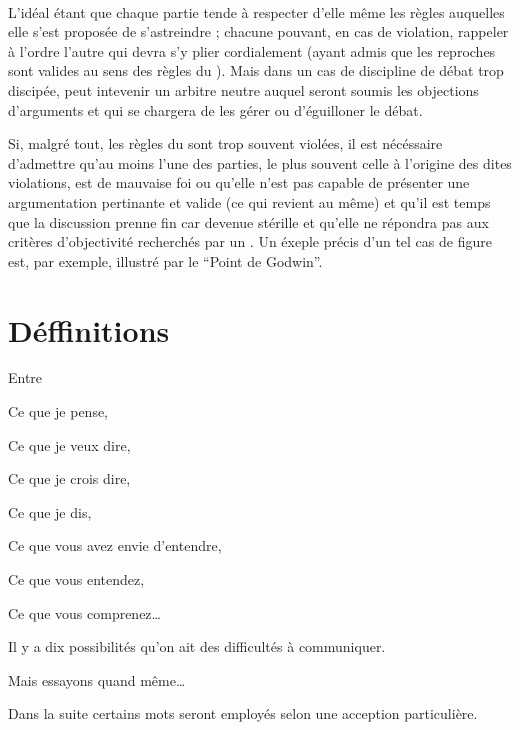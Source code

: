 \paragraph{}
L’idéal étant que chaque partie tende à respecter d’elle même les règles auquelles elle s’est proposée de s’astreindre ; chacune pouvant, en cas de violation, rappeler à l’ordre l’autre qui devra s’y plier cordialement (ayant admis que les reproches sont valides au sens des règles du \mainabbr{}). Mais dans un cas de discipline de débat trop discipée, peut intevenir un arbitre neutre auquel seront soumis les objections d’arguments et qui se chargera de les gérer ou d’éguilloner le débat.

Si, malgré tout, les règles du \mainabbr{} sont trop souvent violées, il est nécéssaire d’admettre qu’au moins l’une des parties, le plus souvent celle à l’origine des dites violations, est de mauvaise foi ou qu’elle n’est pas capable de présenter une argumentation pertinante et valide (ce qui revient au même) et qu’il est temps que la discussion prenne fin car devenue stérille et qu’elle ne répondra pas aux critères d’objectivité recherchés par un \mainabbr{}. Un éxeple précis d’un tel cas de figure est, par exemple, illustré par le \enquote{Point de Godwin}.


\section{Déffinitions}
\epigraph{Entre

Ce que je pense,

Ce que je veux dire,

Ce que je crois dire,

Ce que je dis,

Ce que vous avez envie d’entendre,

Ce que vous entendez,

Ce que vous comprenez…

Il y a dix possibilités qu’on ait des difficultés à communiquer.

Mais essayons quand même…
}{}
Dans la suite certains mots seront employés selon une acception particulière.

